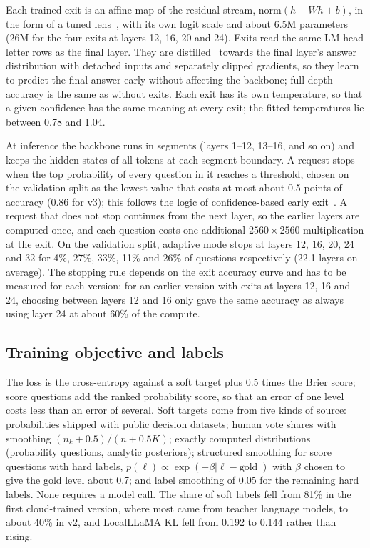 \documentclass[10pt]{article}
\begin{document}
Each trained exit is an affine map of the residual stream, $\mathrm{norm}(h + Wh + b)$, in the form of a tuned lens~\cite{tunedlens}, with its own logit scale and about 6.5M parameters (26M for the four exits at layers 12, 16, 20 and 24).
Exits read the same LM-head letter rows as the final layer.
They are distilled~\cite{hinton} towards the final layer's answer distribution with detached inputs and separately clipped gradients, so they learn to predict the final answer early without affecting the backbone; full-depth accuracy is the same as without exits.
Each exit has its own temperature, so that a given confidence has the same meaning at every exit; the fitted temperatures lie between 0.78 and 1.04.

At inference the backbone runs in segments (layers 1--12, 13--16, and so on) and keeps the hidden states of all tokens at each segment boundary.
A request stops when the top probability of every question in it reaches a threshold, chosen on the validation split as the lowest value that costs at most about 0.5 points of accuracy (0.86 for v3); this follows the logic of confidence-based early exit~\cite{calm,layerskip}.
A request that does not stop continues from the next layer, so the earlier layers are computed once, and each question costs one additional $2560\times 2560$ multiplication at the exit.
On the validation split, adaptive mode stops at layers 12, 16, 20, 24 and 32 for 4\%, 27\%, 33\%, 11\% and 26\% of questions respectively (22.1 layers on average).
The stopping rule depends on the exit accuracy curve and has to be measured for each version: for an earlier version with exits at layers 12, 16 and 24, choosing between layers 12 and 16 only gave the same accuracy as always using layer 24 at about 60\% of the compute.

\subsection{Training objective and labels}
\label{sec:objective}

The loss is the cross-entropy against a soft target plus 0.5 times the Brier score; score questions add the ranked probability score, so that an error of one level costs less than an error of several.
Soft targets come from five kinds of source: probabilities shipped with public decision datasets; human vote shares with smoothing $(n_k+0.5)/(n+0.5K)$; exactly computed distributions (probability questions, analytic posteriors); structured smoothing for score questions with hard labels, $p(\ell)\propto\exp(-\beta|\ell-\text{gold}|)$ with $\beta$ chosen to give the gold level about 0.7; and label smoothing of 0.05 for the remaining hard labels.
None requires a model call.
The share of soft labels fell from 81\% in the first cloud-trained version, where most came from teacher language models, to about 40\% in v2, and LocalLLaMA KL fell from 0.192 to 0.144 rather than rising.
\end{document}
